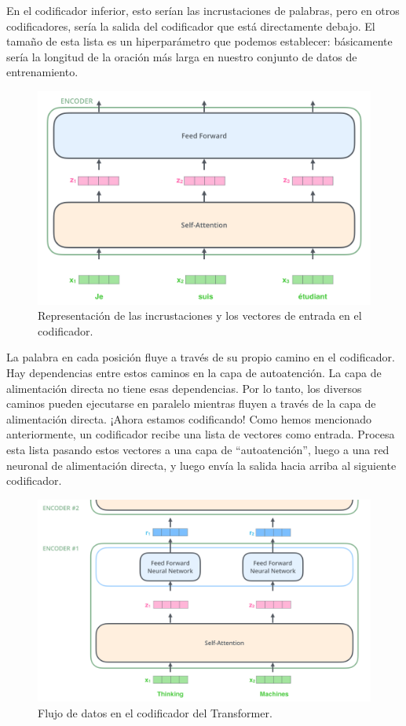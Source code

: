 En el codificador inferior, esto serían las incrustaciones de palabras, pero en otros codificadores, sería la salida del codificador que está directamente debajo. El tamaño de esta lista es un hiperparámetro que podemos establecer: básicamente sería la longitud de la oración más larga en nuestro conjunto de datos de entrenamiento.

\begin{figure}[h]
\centering
\includegraphics[scale=0.2]{pics/encoder_with_tensors.png}
\caption{Representación de las incrustaciones y los vectores de entrada en el codificador.}
\end{figure}

La palabra en cada posición fluye a través de su propio camino en el codificador. Hay dependencias entre estos caminos en la capa de autoatención. La capa de alimentación directa no tiene esas dependencias. Por lo tanto, los diversos caminos pueden ejecutarse en paralelo mientras fluyen a través de la capa de alimentación directa.
¡Ahora estamos codificando! Como hemos mencionado anteriormente, un codificador recibe una lista de vectores como entrada. Procesa esta lista pasando estos vectores a una capa de ``autoatención'', luego a una red neuronal de alimentación directa, y luego envía la salida hacia arriba al siguiente codificador.


\begin{figure}[h]
\centering
\includegraphics[scale=0.2]{pics/encoder_with_tensors_2.png}
\caption{Flujo de datos en el codificador del Transformer.}
\end{figure}


